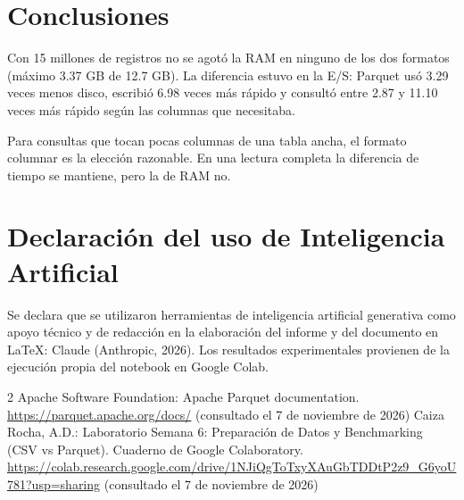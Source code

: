 \documentclass[runningheads]{llncs}
\begin{document}
\section{Conclusiones}

Con 15 millones de registros no se agotó la RAM en ninguno de los dos formatos (máximo 3.37 GB de 12.7 GB). La diferencia estuvo en la E/S: Parquet usó 3.29 veces menos disco, escribió 6.98 veces más rápido y consultó entre 2.87 y 11.10 veces más rápido según las columnas que necesitaba.

Para consultas que tocan pocas columnas de una tabla ancha, el formato columnar es la elección razonable. En una lectura completa la diferencia de tiempo se mantiene, pero la de RAM no.

\section{Declaración del uso de Inteligencia Artificial}

Se declara que se utilizaron herramientas de inteligencia artificial generativa como apoyo técnico y de redacción en la elaboración del informe y del documento en LaTeX: Claude (Anthropic, 2026). Los resultados experimentales provienen de la ejecución propia del notebook en Google Colab.

\begin{thebibliography}{2}
 Apache Software Foundation: Apache Parquet documentation. \url{https://parquet.apache.org/docs/} (consultado el 7 de noviembre de 2026)
 Caiza Rocha, A.D.: Laboratorio Semana 6: Preparación de Datos y Benchmarking (CSV vs Parquet). Cuaderno de Google Colaboratory. \url{https://colab.research.google.com/drive/1NJiQgToTxyXAuGbTDDtP2z9_G6yoU781?usp=sharing} (consultado el 7 de noviembre de 2026)
\end{thebibliography}
\end{document}
